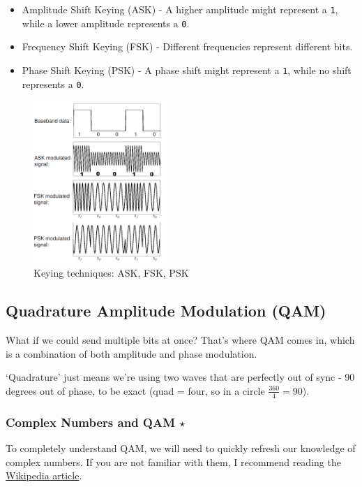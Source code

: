 \begin{itemize}
    \item Amplitude Shift Keying (ASK) -  A higher amplitude might represent a \texttt{1}, while a lower amplitude represents a \texttt{0}.
    \item Frequency Shift Keying (FSK) - Different frequencies represent different bits.
    \item Phase Shift Keying (PSK) - A phase shift might represent a \texttt{1}, while no shift represents a \texttt{0}.
\end{itemize}
\begin{figure}[h]
    \centering
    \includegraphics[width=0.45\textwidth]{assets/osi/physical/signals/sk.png}
    \caption{Keying techniques: ASK, FSK, PSK}\label{fig:keying_techniques}
\end{figure}

\subsection{Quadrature Amplitude Modulation (QAM)}
What if we could send multiple bits at once? That's where QAM comes in, which is a combination of both amplitude and phase modulation.

`Quadrature' just means we're using two waves that are perfectly out of sync - 90 degrees out of phase, to be exact (quad = four, so in a circle $\frac{360}{4} = 90$).

\subsubsection{Complex Numbers and QAM $\star$}
To completely understand QAM, we will need to quickly refresh our knowledge of complex numbers. If you are not familiar with them, I recommend reading the \href{https://en.wikipedia.org/wiki/Complex_number}{Wikipedia article}. 

